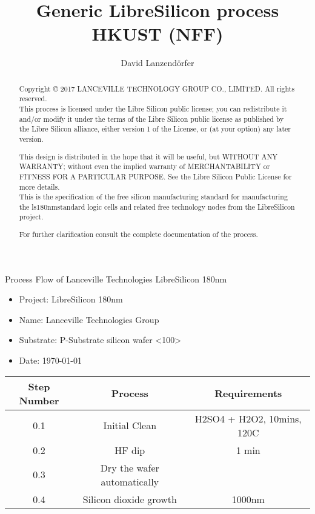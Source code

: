 \documentclass[a4paper,landscape]{article}
\author{David Lanzendörfer}
\title{Generic LibreSilicon process HKUST (NFF)}
\def\CrossSection {0.4}
\begin{document}
\maketitle

\begin{abstract}
	Copyright © 2017 LANCEVILLE TECHNOLOGY GROUP CO., LIMITED. All rights reserved. \\

	This process is licensed under the Libre Silicon public license; you can redistribute it and/or modify it under the terms of the Libre Silicon public license
	as published by the Libre Silicon alliance, either version 1 of the License, or (at your option) any later version.

	This design is distributed in the hope that it will be useful, but WITHOUT ANY WARRANTY; without even the implied warranty of MERCHANTABILITY or FITNESS FOR A PARTICULAR PURPOSE.
	See the Libre Silicon Public License for more details. \\

	This is the specification of the free silicon manufacturing standard for manufacturing the ls180nm\footnotemark standard logic cells and related free technology nodes from the LibreSilicon project.
	
	For further clarification consult the complete documentation of the process.

\end{abstract}
\vfill
\newpage

Process Flow of Lanceville Technologies LibreSilicon 180nm

\begin{itemize}
	\item Project: LibreSilicon 180nm
	\item Name: Lanceville Technologies Group
	\item Substrate: P-Substrate silicon wafer <100>
	\item Date: \today
\end{itemize}

\begin{tikzpicture}[node distance = 3cm, auto, thick,scale=\CrossSection, every node/.style={transform shape}]
	
\end{tikzpicture} \small \begin{tabular}{|c|c|c|}
\hline
\textbf{Step Number} &
\textbf{Process} &
\textbf{Requirements} \\
\hline

0.1 &
Initial Clean &
H2SO4 + H2O2, 10mins, 120C \\

\hline

0.2 &
HF dip &
1 min \\

\hline

0.3 &
Dry the wafer automatically &
{}
\\

\hline

0.4 &
Silicon dioxide growth &
1000nm \\

\hline

\end{tabular}
\end{document}
